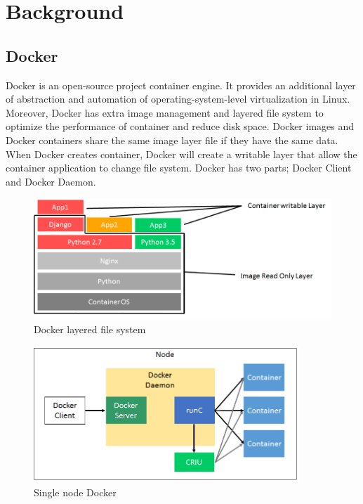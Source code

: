 \chapter{Background}
\label{chap:background}
\section{Docker}
Docker \cite{Docker} is an open-source project container engine. It provides an additional layer of abstraction and automation of operating-system-level virtualization in Linux. Moreover, Docker has extra image management and layered file system to optimize the performance of container and reduce disk space. Docker images and Docker containers share the same image layer file if they have the same data. When Docker creates container, Docker will create a writable layer that allow the container application to change file system. Docker has two parts; Docker Client and Docker Daemon.

\begin{figure}[h]
\begin{center}
\includegraphics[width=15cm]{figure/layered_file_system.png}
\end{center}
\caption{Docker layered file system}
\label{fig:Docker layered file system}
\end{figure}

\begin{figure}[h]
\begin{center}
\includegraphics[width=10cm]{figure/single_node.png}
\end{center}
\caption{Single node Docker}
\end{figure}


